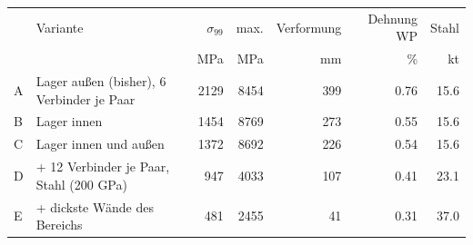 \begin{tabular}{@{}llrrrrr@{}}\toprule
 & Variante & $\sigma_{99}$ & max. & Verformung & Dehnung WP & Stahl \\
 & & MPa & MPa & mm & \% & kt \\\midrule
A & Lager außen (bisher), 6 Verbinder je Paar & \num{2129} & \num{8454} & \num{399} & \num{0.76} & \num{15.6} \\
B & Lager innen & \num{1454} & \num{8769} & \num{273} & \num{0.55} & \num{15.6} \\
C & Lager innen und außen & \num{1372} & \num{8692} & \num{226} & \num{0.54} & \num{15.6} \\
D & + 12 Verbinder je Paar, Stahl (200 GPa) & \num{947} & \num{4033} & \num{107} & \num{0.41} & \num{23.1} \\
E & + dickste Wände des Bereichs & \num{481} & \num{2455} & \num{41} & \num{0.31} & \num{37.0} \\
\bottomrule\end{tabular}
